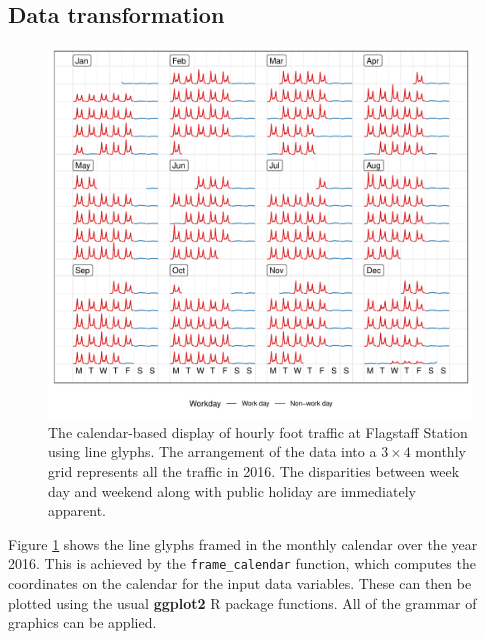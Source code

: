 \documentclass[12pt]{article}
\begin{document}
\label{sec:algorithm}

\hypertarget{data-transformation}{%
\subsection{Data transformation}\label{data-transformation}}

\label{sec:transformation}

\begin{figure}

{\centering \includegraphics[width=\textwidth]{figure/fs-2016-1} 

}

\caption{The calendar-based display of hourly foot traffic at Flagstaff Station using line glyphs. The arrangement of the data into a $3 \times 4$ monthly grid represents all the traffic in 2016. The disparities between week day and weekend along with public holiday are immediately apparent.}\label{fig:fs-2016}
\end{figure}

Figure \ref{fig:fs-2016} shows the line glyphs framed in the monthly
calendar over the year 2016. This is achieved by the
\texttt{frame\_calendar} function, which computes the coordinates on the
calendar for the input data variables. These can then be plotted using
the usual \textbf{ggplot2} R package \citep{R-ggplot2} functions. All of
the grammar of graphics can be applied.
\end{document}
